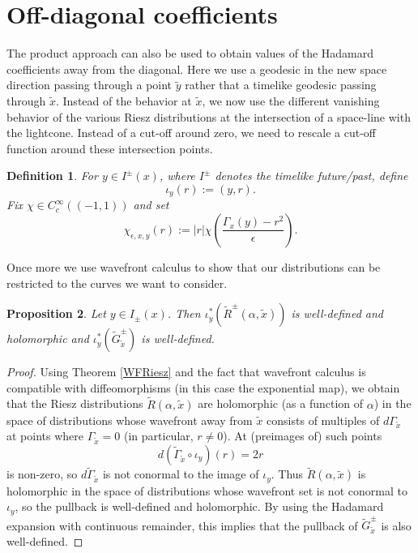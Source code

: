 \documentclass[11pt]{article}
\newtheorem{df}{Definition}[section]
\newtheorem{prop}[df]{Proposition}
\begin{document}
\section{Off-diagonal coefficients}
\label{ProdOffDiag}
The product approach can also be used to obtain values of the Hadamard coefficients away from the diagonal. Here we use a geodesic in the new space direction passing through a point $\tilde y$ rather that a timelike geodesic passing through $\tilde x$. Instead of the behavior at $\tilde x$, we now use the different vanishing behavior of the various Riesz distributions at the intersection of a space-line with the lightcone. Instead of a cut-off around zero, we need to rescale a cut-off function around these intersection points.
\begin{df}
	For $y\in I^\pm(x)$, where $I^\pm$ denotes the timelike future/past, define \[\iota_y(r):=(y,r).\] Fix $\chi\in C_c^\infty((-1,1))$ and set \[\chi_{\epsilon,x,y}(r):=|r|\chi\left(\frac{\Gamma_x(y)-r^2}{\epsilon}\right).\]
\end{df}
Once more we use wavefront calculus to show that our distributions can be restricted to the curves we want to consider. 
\begin{prop}
	 Let $y\in I_\pm(x)$. Then \hskip0pt $\iota_y^*(\tilde R^\pm(\alpha,\tilde x))$ is  well-defined and holomorphic and $\iota_y^*(\tilde G^\pm_{\tilde x})$ is well-defined.
\end{prop}
\begin{proof}
	
	
	Using Theorem \ref{WFRiesz} and the fact that wavefront calculus is compatible with diffeomorphisms (in this case the exponential map), we obtain that the Riesz distributions $\tilde R(\alpha,\tilde x)$ are holomorphic (as a function of $\alpha$) in the space of distributions whose wavefront away from $\tilde x$ consists of multiples of $d\Gamma_{\tilde x}$ at points where $\Gamma_{\tilde x}=0$ (in particular, $r\neq 0$). At (preimages of) such points
	\[d(\tilde\Gamma_{\tilde x}\circ\iota_y)(r)=2r\]
	is non-zero, so $d\tilde \Gamma_{\tilde x}$ is not conormal to the image of $\iota_y$. Thus $\tilde R(\alpha,{\tilde x})$ is holomorphic in the space of distributions whose wavefront set is not conormal to $\iota_y$, so the pullback is well-defined and holomorphic. By using the Hadamard expansion with continuous remainder, this implies that the pullback of $\tilde G^\pm_{\tilde x}$ is also well-defined.
\end{proof}
\end{document}
